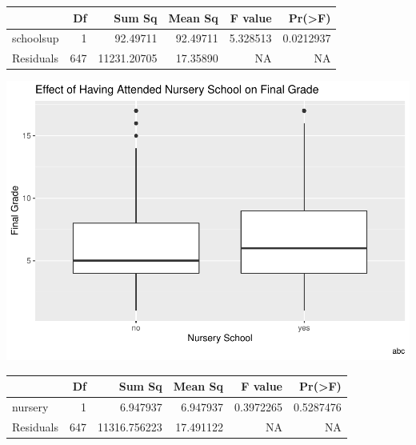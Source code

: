 \documentclass[
]{article}
\begin{document}
\begin{tabular}{l|r|r|r|r|r}
\hline
  & Df & Sum Sq & Mean Sq & F value & Pr(>F)\\
\hline
schoolsup & 1 & 92.49711 & 92.49711 & 5.328513 & 0.0212937\\
\hline
Residuals & 647 & 11231.20705 & 17.35890 & NA & NA\\
\hline
\end{tabular}
\newpage

\includegraphics{proj.-1write-up_files/figure-latex/por-nursery-1.pdf}

\begin{tabular}{l|r|r|r|r|r}
\hline
  & Df & Sum Sq & Mean Sq & F value & Pr(>F)\\
\hline
nursery & 1 & 6.947937 & 6.947937 & 0.3972265 & 0.5287476\\
\hline
Residuals & 647 & 11316.756223 & 17.491122 & NA & NA\\
\hline
\end{tabular}
\end{document}
